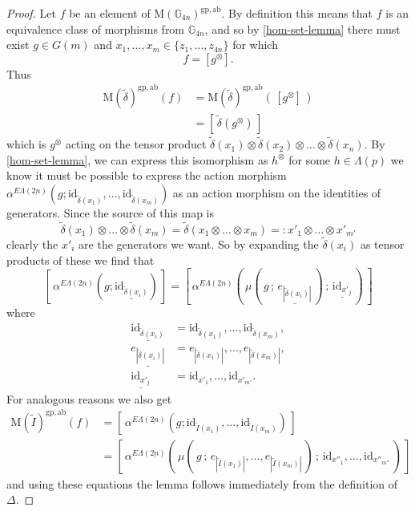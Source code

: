 \documentclass{amsbook} %
\newcommand{\id}{\textrm{id}}
\newcommand{\ELnn}{E\Lambda(\underline{2n})}
\numberwithin{section}{chapter}
\begin{document}
\begin{proof}  
Let $f$ be an element of $\mathrm{M}(\mathbb{G}_{4n})^{\mathrm{gp, ab}}$. By definition this means that $f$ is an equivalence class of morphisms from $\mathbb{G}_{4n}$, and so by \cref{hom-set-lemma} there must exist $g \in G(m)$ and $x_1, \ldots, x_m \in \{ z_1, \ldots, z_{4n} \}$ for which
  \[
    f = \left[g^{\otimes}\right].
  \]
Thus
  \begin{align*}
		\mathrm{M}(\tilde{\delta})^{\mathrm{gp, ab}}(f) &= \mathrm{M}(\tilde{\delta})^{\mathrm{gp, ab}} \left(\,\left[g^{\otimes} \right] \,\right) \\
		&= \left[ \, \tilde{\delta}\left(g^{\otimes}\right) \, \right]  
  \end{align*}
which is $g^{\otimes}$ acting on the tensor product $\tilde{\delta}(x_1) \otimes \tilde{\delta}(x_2) \otimes \ldots \otimes \tilde{\delta}(x_n)$.
By \cref{hom-set-lemma}, we can express this isomorphism as $h^{\otimes}$ for some $h \in \Lambda(p)$ we know it must be possible to express the action morphism $\alpha^{\ELnn}(g; \id_{\tilde{\delta}(x_1)}, \ldots, \id_{\tilde{\delta}(x_m)})$ as an action morphism on the identities of generators. Since the source of this map is
  \[
    \tilde{\delta}(x_1) \otimes \ldots \otimes \tilde{\delta}(x_m) = \tilde{\delta}(x_1 \otimes \ldots \otimes x_m) =: x'_1 \otimes \ldots \otimes x'_{m'}
  \]
clearly the $x'_i$ are the generators we want. So by expanding the $\tilde{\delta}(x_i)$ as tensor products of these we find that
  \[
    \left[ \, \alpha^{\ELnn}\left(g; \underline{\id_{\tilde{\delta}(x_i)}}\right) \, \right] = \left[ \, \alpha^{\ELnn}\left( \, \mu\left( \, g \, ; \, \underline{e_{\left|\tilde{\delta}(x_i)\right|}}\, \right) \, ; \, \underline{\id_{x'_j}}\, \right) \, \right]
  \]
where
  \begin{align*}
    \underline{\id_{\tilde{\delta}(x_i)}} &= \id_{\tilde{\delta}(x_1)}, \ldots, \id_{\tilde{\delta}(x_m)}, \\
    \underline{e_{\left|\tilde{\delta}(x_i)\right|}} &= e_{|\tilde{\delta}(x_1)|}, \ldots, e_{\left|\tilde{\delta}(x_m)\right|}, \\
    \underline{\id_{x'_j}} &= \id_{x'_1}, \ldots, \id_{x'_{m'}}.
  \end{align*}
For analogous reasons we also get
\begin{align*}
			\mathrm{M}(\tilde{I})^{\mathrm{gp, ab}}(f) & = \left[ \, \alpha^{\ELnn}\left(g; \id_{\tilde{I}(x_1)}, \ldots, \id_{\tilde{I}(x_m)}\right) \, \right]  \\
			&=  \left[ \, \alpha^{\ELnn}\left( \, \mu\left( \, g \, ; \, e_{|\tilde{I}(x_1)|}, \ldots, e_{|\tilde{I}(x_m)|} \, \right) \, ; \, \id_{x''_1}, \ldots,  \id_{x''_{m''}} \, \right) \, \right]
\end{align*}
and using these equations the lemma follows immediately from the definition of $\Delta$.
\end{proof}
\end{document}
